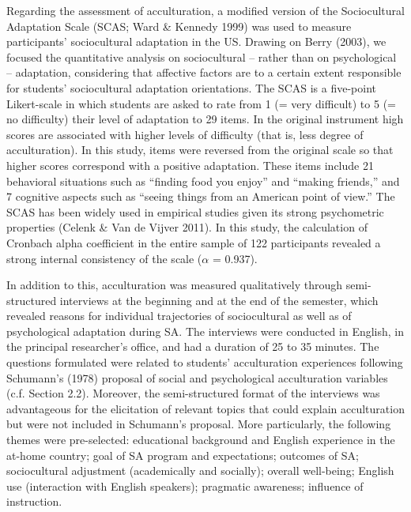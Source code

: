 \documentclass[12pt]{article}
\newenvironment{styleStandard}{\setlength\leftskip{0cm}\setlength\rightskip{0cm plus 1fil}\setlength\parindent{0cm}\setlength\parfillskip{0pt plus 1fil}\setlength\parskip{0in plus 1pt}\writerlistparindent\writerlistleftskip\leavevmode\normalfont\normalsize\writerlistlabel\ignorespaces}{\unskip\vspace{0.111in plus 0.0111in}\par}
\newcommand\writerlistleftskip{}
\newcommand\writerlistparindent{}
\newcommand\writerlistlabel{}
\begin{document}
\begin{styleStandard}
Regarding the assessment of acculturation, a modified version of the Sociocultural Adaptation Scale (SCAS; Ward \& Kennedy 1999) was used to measure participants’ sociocultural adaptation in the US. Drawing on Berry (2003), we focused the quantitative analysis on sociocultural – rather than on psychological – adaptation, considering that affective factors are to a certain extent responsible for students’ sociocultural adaptation orientations. The SCAS is a five-point Likert-scale in which students are asked to rate from 1 (= very difficult) to 5 (= no difficulty) their level of adaptation to 29 items. In the original instrument high scores are associated with higher levels of difficulty (that is, less degree of acculturation). In this study, items were reversed from the original scale so that higher scores correspond with a positive adaptation. These items include 21 behavioral situations such as “finding food you enjoy” and “making friends,” and 7 cognitive aspects such as “seeing things from an American point of view.” The SCAS has been widely used in empirical studies given its strong psychometric properties (Celenk \& Van de Vijver 2011). In this study, the calculation of Cronbach alpha coefficient in the entire sample of 122 participants revealed a strong internal consistency of the scale ($\alpha $ = 0.937).
\end{styleStandard}

\begin{styleStandard}
In addition to this, acculturation was measured qualitatively through semi-structured interviews at the beginning and at the end of the semester, which revealed reasons for individual trajectories of sociocultural as well as of psychological adaptation during SA. The interviews were conducted in English, in the principal researcher’s office, and had a duration of 25 to 35 minutes. The questions formulated were related to students’ acculturation experiences following Schumann’s (1978) proposal of social and psychological acculturation variables (c.f. Section 2.2). Moreover, the semi-structured format of the interviews was advantageous for the elicitation of relevant topics that could explain acculturation but were not included in Schumann’s proposal. More particularly, the following themes were pre-selected: educational background and English experience in the at-home country; goal of SA program and expectations; outcomes of SA; sociocultural adjustment (academically and socially); overall well-being; English use (interaction with English speakers); pragmatic awareness; influence of instruction.
\end{styleStandard}
\end{document}
